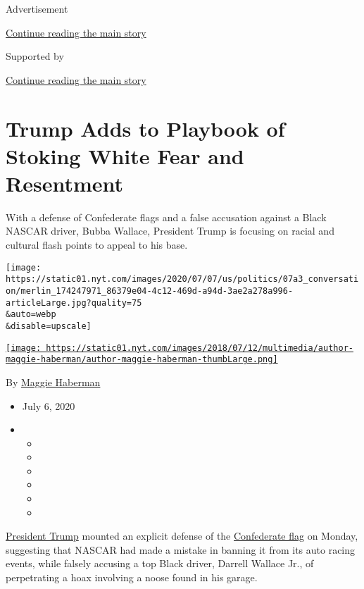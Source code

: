 Advertisement

\protect\hyperlink{after-top}{Continue reading the main story}

Supported by

\protect\hyperlink{after-sponsor}{Continue reading the main story}

\hypertarget{trump-adds-to-playbook-of-stoking-white-fear-and-resentment}{%
\section{Trump Adds to Playbook of Stoking White Fear and
Resentment}\label{trump-adds-to-playbook-of-stoking-white-fear-and-resentment}}

With a defense of Confederate flags and a false accusation against a
Black NASCAR driver, Bubba Wallace, President Trump is focusing on
racial and cultural flash points to appeal to his base.

\texttt{[image: https://static01.nyt.com/images/2020/07/07/us/politics/07a3\_conversation/merlin\_174247971\_86379e04-4c12-469d-a94d-3ae2a278a996-articleLarge.jpg?quality=75\\\&auto=webp\\\&disable=upscale]}

\href{https://www.nytimes.com/by/maggie-haberman}{\texttt{[image: https://static01.nyt.com/images/2018/07/12/multimedia/author-maggie-haberman/author-maggie-haberman-thumbLarge.png]}}

By \href{https://www.nytimes.com/by/maggie-haberman}{Maggie Haberman}

\begin{itemize}
\item
  July 6, 2020
\item
  \begin{itemize}
  \item
  \item
  \item
  \item
  \item
  \item
  \end{itemize}
\end{itemize}

\href{https://www.nytimes.com/interactive/2020/us/elections/donald-trump.html}{President
Trump} mounted an explicit defense of the
\href{https://www.nytimes.com/2020/07/17/us/politics/pentagon-trump-confederate-symbols.html}{Confederate
flag} on Monday, suggesting that NASCAR had made a mistake in banning it
from its auto racing events, while falsely accusing a top Black driver,
Darrell Wallace Jr., of perpetrating a hoax involving a noose found in
his garage.

